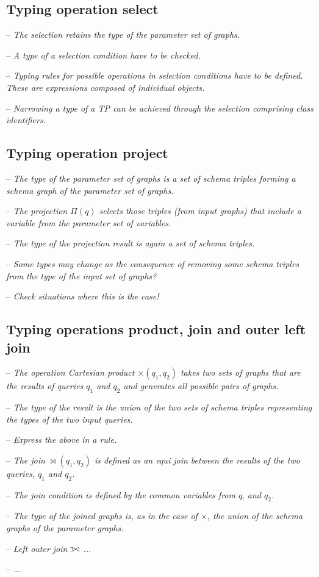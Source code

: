 \documentclass[runningheads]{llncs}
\newcommand{\notes}[1]{\noindent\begin{small}-- \emph{#1}\\\end{small}}
\def\ojoin{\setbox0=\hbox{$\bowtie$}%
  \rule[-.02ex]{.25em}{.4pt}\llap{\rule[\ht0]{.25em}{.4pt}}}
\def\leftouterjoin{\mathbin{\ojoin\mkern-5.8mu\bowtie}}
\begin{document}
\subsection{Typing operation select}

\noindent
\notes{The selection retains the type of the parameter set of graphs.}
\notes{A type of a selection condition have to be checked.}
\notes{Typing rules for possible operations in selection conditions have to be defined. These are expressions composed of individual objects.}
\notes{Narrowing a type of a TP can be achieved through the selection comprising class identifiers.}


\subsection{Typing operation project}

\noindent
\notes{The type of the parameter set of graphs is a set of schema triples forming a schema graph of the parameter set of graphs.}
\notes{The projection $\Pi(q)$ selects those triples (from input graphs) that include a variable from the parameter set of variables.}
\notes{The type of the projection result is again a set of schema triples.}
\notes{Some types may change as the consequence of removing some schema triples from the type of the input set of graphs?}
\notes{Check situations where this is the case!}


\subsection{Typing operations product, join and outer left join}

\noindent
\notes{The operation Cartesian product $\times(q_1,q_2)$ takes two sets of graphs that are the results of queries $q_1$ and $q_2$ and generates all possible pairs of graphs.}
\notes{The type of the result is the union of the two sets of schema triples representing the types of the two input queries.}
\notes{Express the above in a rule.}

\noindent
\notes{The join $\bowtie(q_1,q_2)$ is defined as an equi join between the results of the two queries, $q_1$ and $q_2$.}
\notes{The join condition is defined by the common variables from $q_!$ and $q_2$.}
\notes{The type of the joined graphs is, as in the case of $\times$, the union of the schema graphs of the parameter graphs.}

\noindent
\notes{Left outer join $\leftouterjoin$ ...}
\notes{...}
\end{document}
